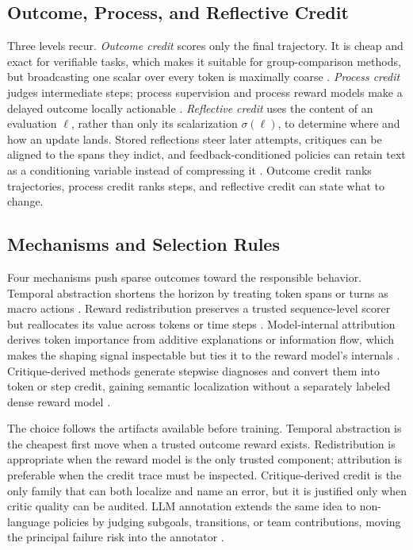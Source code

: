 \subsection{Outcome, Process, and Reflective Credit}
\label{subsec:credit-granularity}

Three levels recur. \emph{Outcome credit} scores only the final trajectory. It is cheap and exact for verifiable tasks, which makes it suitable for group-comparison methods, but broadcasting one scalar over every token is maximally coarse \citep{guo2025deepseek}. \emph{Process credit} judges intermediate steps; process supervision and process reward models make a delayed outcome locally actionable \citep{uesato2022solving,lightman2024let}. \emph{Reflective credit} uses the content of an evaluation $\ell$, rather than only its scalarization $\sigma(\ell)$, to determine where and how an update lands. Stored reflections steer later attempts, critiques can be aligned to the spans they indict, and feedback-conditioned policies can retain text as a conditioning variable instead of compressing it \citep{shinn2023reflexion,wang2026text2gradreinforcementlearningnatural,luo2025fcp}. Outcome credit ranks trajectories, process credit ranks steps, and reflective credit can state what to change.

\subsection{Mechanisms and Selection Rules}
\label{subsec:credit-token}

Four mechanisms push sparse outcomes toward the responsible behavior. Temporal abstraction shortens the horizon by treating token spans or turns as macro actions \citep{chai2024marlhf,zhou2024archer}. Reward redistribution preserves a trusted sequence-level scorer but reallocates its value across tokens or time steps \citep{li2024red,qu2024latent}. Model-internal attribution derives token importance from additive explanations or information flow, which makes the shaping signal inspectable but ties it to the reward model's internals \citep{koo2025learning,dong2026how}. Critique-derived methods generate stepwise diagnoses and convert them into token or step credit, gaining semantic localization without a separately labeled dense reward model \citep{xie2025capo,zhou2024treg,liu2025agenticreinforcementlearningimplicit}.

The choice follows the artifacts available before training. Temporal abstraction is the cheapest first move when a trusted outcome reward exists. Redistribution is appropriate when the reward model is the only trusted component; attribution is preferable when the credit trace must be inspected. Critique-derived credit is the only family that can both localize and name an error, but it is justified only when critic quality can be audited. LLM annotation extends the same idea to non-language policies by judging subgoals, transitions, or team contributions, moving the principal failure risk into the annotator \citep{pignatelli2024assessing,zhong2024policy,lin2025speaking}.

